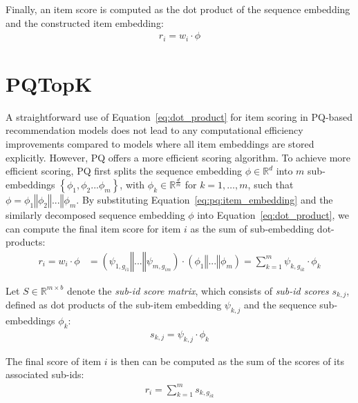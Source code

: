 \documentclass[sigconf,natbib=true, review=true]{acmart} %
\begin{document}
Finally, an item score is computed as the dot product of the  sequence embedding and the constructed item embedding: 
\begin{align}
    r_i = w_i \cdot \phi\label{eq:dot_product}
\end{align}

\section{PQTopK} \label{sec:pq_topk}
 A straightforward use of Equation~\eqref{eq:dot_product} for item scoring in PQ-based recommendation models does not lead to any computational efficiency improvements compared to models where all item embeddings are stored explicitly.
However, PQ offers a more efficient scoring algorithm. To achieve more efficient scoring, PQ  first splits the sequence embedding $\phi \in \mathbb{R}^{d}$ into $m$ sub-embeddings $\left\{\phi_1, \phi_2 ... \phi_m\right\}$, with $\phi_{k} \in \mathbb{R}^{\frac{d}{m}}$ for $k=1, \ldots,m$, such that $\phi = \phi_1  \mathbin\Vert \phi_2  \mathbin\Vert ... \mathbin\Vert  \phi_m$.
By substituting Equation~\eqref{eq:pq:item_embedding} and the similarly decomposed sequence embedding $\phi$ into Equation~\eqref{eq:dot_product}, we can compute the final item score for item $i$ as the sum of sub-embedding dot-products: 
\begin{align}
   r_i = w_i \cdot \phi &= (\psi_{1,g_{i1}} \mathbin\Vert ... \mathbin\Vert  \psi_{m,g_{im}}) \cdot (\phi_1  \mathbin\Vert ... \mathbin\Vert  \phi_m) = \sum_{k=1}^m \psi_{k,g_{ik}} \cdot \phi_k \nonumber
\end{align}

Let $S \in \mathbb{R}^{m \times b}$ denote the \emph{sub-id score matrix}, which consists of \emph{sub-id scores} $s_{k,j}$, defined as dot products of the sub-item embedding $\psi_{k,j}$ and the sequence sub-embeddings $\phi_k$:
\begin{align}
s_{k,j} = \psi_{k,j} \cdot \phi_k\label{eq:sub_item_scores}
\end{align}

The final score of item $i$ is then can be computed as the sum of the scores of its associated sub-ids:
\begin{align}
   r_{i} = \sum_{k=1}^m s_{k,g_{ik}} \label{eq:sum_sub_scores}
\end{align}
\end{document}
